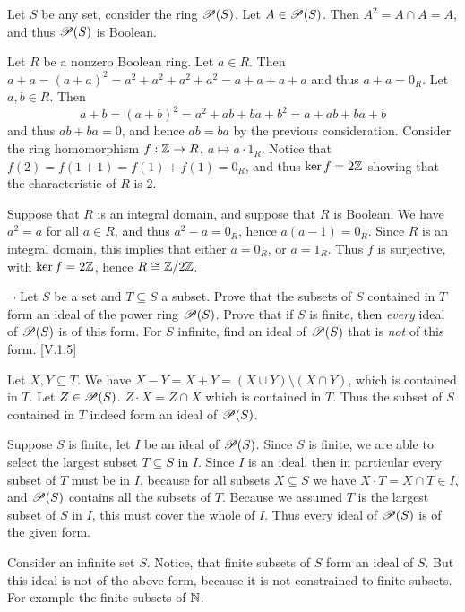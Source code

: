 \begin{solution}
	Let $S$ be any set, consider the ring $\mathscr{P}(S)$. Let $A \in \mathscr{P}(S)$. Then $A^2 = A \cap A = A$, and thus $\mathscr{P}(S)$ is Boolean.
	
	Let $R$ be a nonzero Boolean ring. Let $a \in R$. Then $a + a = (a + a)^2 = a^2 + a^2 + a^2 + a^2 = a + a + a + a$ and thus $a + a = 0_R$. Let $a, b \in R$. Then
	\[
		a+b = (a+b)^2 = a^2 + ab + ba + b^2 = a + ab + ba + b
	\]
	and thus $ab + ba = 0$, and hence $ab = ba$ by the previous consideration.
	Consider the ring homomorphism $f: \mathbb{Z} \to R$, $a \mapsto a \cdot 1_R$. Notice that $f(2)=f(1+1)=f(1)+f(1)=0_R$, and thus $\ker f = 2\mathbb{Z}$ showing that the characteristic of $R$ is $2$.
	
	Suppose that $R$ is an integral domain, and suppose that $R$ is Boolean. We have $a^2 = a$ for all $a \in R$, and thus $a^2 - a = 0_R$, hence $a(a - 1) = 0_R$. Since $R$ is an integral domain, this implies that either $a = 0_R$, or $a = 1_R$. Thus $f$ is surjective, with $\ker f = 2\mathbb{Z}$, hence $R \cong \mathbb{Z}/2\mathbb{Z}$.
\end{solution}

\begin{problem}
	$\neg$ Let $S$ be a set and $T \subseteq S$ a subset. Prove that the subsets of $S$ contained in $T$ form an ideal of the power ring $\mathscr{P}(S)$. Prove that if $S$ is finite, then \emph{every} ideal of $\mathscr{P}(S)$ is of this form. For $S$ infinite, find an ideal of $\mathscr{P}(S)$ that is \emph{not} of this form. [V.1.5]
\end{problem}

\begin{solution}
	Let $X,Y \subseteq T$. We have $X - Y = X + Y = (X \cup Y) \setminus (X \cap Y)$, which is contained in $T$. Let $Z \in \mathscr{P}(S)$. $Z \cdot X = Z \cap X$ which is contained in $T$. Thus the subset of $S$ contained in $T$ indeed form an ideal of $\mathscr{P}(S)$.
	
	Suppose $S$ is finite, let $I$ be an ideal of $\mathscr{P}(S)$. Since $S$ is finite, we are able to select the largest subset $T \subseteq S$ in $I$. Since $I$ is an ideal, then in particular every subset of $T$ must be in $I$, because for all subsets $X \subseteq S$ we have $X \cdot T = X \cap T \in I$, and $\mathscr{P}(S)$ contains all the subsets of $T$. Because we assumed $T$ is the largest subset of $S$ in $I$, this must cover the whole of $I$. Thus every ideal of $\mathscr{P}(S)$ is of the given form.
	
	Consider an infinite set $S$. Notice, that finite subsets of $S$ form an ideal of $S$. But this ideal is not of the above form, because it is not constrained to finite subsets. For example the finite subsets of $\mathbb{N}$.
\end{solution}

